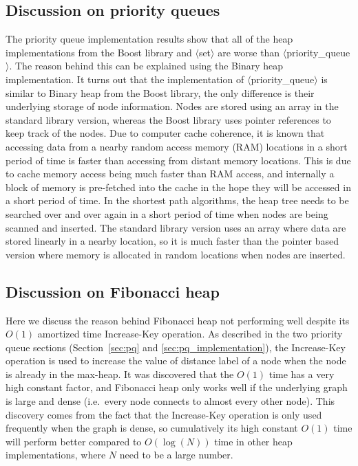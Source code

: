 \subsection{Discussion on priority queues}
The priority queue implementation results show that
all of the heap implementations from the Boost library and $\langle$set$\rangle$ are worse than $\langle$priority\_queue$\rangle$.
The reason behind this can be explained using the Binary heap implementation.
It turns out that the implementation of $\langle$priority\_queue$\rangle$ is similar to Binary heap from the Boost library,
the only difference is their underlying storage of node information.
Nodes are stored using an array in the standard library version,
whereas the Boost library uses pointer references to keep track of 
the nodes.
Due to computer cache coherence,
it is known that accessing data from a nearby random access memory (RAM) locations in a short period of time is faster than accessing from distant memory locations.
This is due to cache memory access being much faster than RAM access,
and internally a block of memory is pre-fetched into the cache in the hope they will be accessed in a short period of time.
In the shortest path algorithms,
the heap tree needs to be searched over and over again in a short period of time when nodes are being scanned and inserted.
The standard library version uses an array where data are stored linearly in a nearby location,
so it is much faster than the pointer based version where memory is allocated in random locations when nodes are inserted.

\subsection{Discussion on Fibonacci heap}
Here we discuss the reason behind Fibonacci heap not performing well despite its $O(1)$ amortized time Increase-Key operation.
As described in the two priority queue sections (Section~\ref{sec:pq} and \ref{sec:pq_implementation}),
the Increase-Key operation is used to increase the value of distance label of a node when the node is already in the max-heap.
It was discovered that the $O(1)$ time has a very high constant factor,
and Fibonacci heap only works well if the underlying graph is large and dense (i.e.\ every node connects to almost every other node).
This discovery comes from the fact that 
the Increase-Key operation is only used frequently when the graph is dense,
so cumulatively its high constant $O(1)$ time will perform better compared to $O(\log(N))$ time in other heap implementations, where $N$ need to be a large number.

